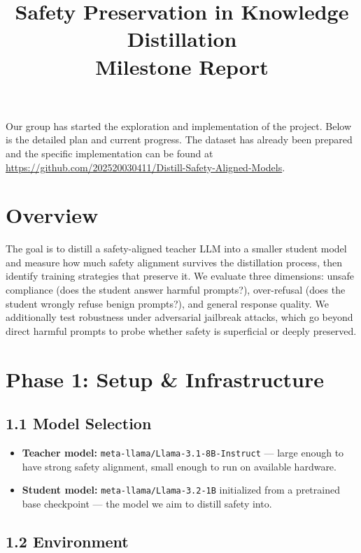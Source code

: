 \documentclass[11pt]{article}
\title{\textbf{Safety Preservation in Knowledge Distillation}\\[0.4em]
\large Milestone Report}
\date{}
\begin{document}
\maketitle

Our group has started the exploration and implementation of the project. Below is the detailed plan and current progress. The dataset has already been prepared and the specific implementation can be found at \href{https://github.com/202520030411/Distill-Safety-Aligned-Models}{https://github.com/202520030411/Distill-Safety-Aligned-Models}.

\section{Overview}

The goal is to distill a safety-aligned teacher LLM into a smaller student model and measure how much safety alignment survives the distillation process, then identify training strategies that preserve it. We evaluate three dimensions: unsafe compliance (does the student answer harmful prompts?), over-refusal (does the student wrongly refuse benign prompts?), and general response quality. We additionally test robustness under adversarial jailbreak attacks, which go beyond direct harmful prompts to probe whether safety is superficial or deeply preserved.

\section{Phase 1: Setup \& Infrastructure}

\subsection{1.1 Model Selection}

\begin{itemize}
    \item \textbf{Teacher model:} \texttt{meta-llama/Llama-3.1-8B-Instruct} --- large enough to have strong safety alignment, small enough to run on available hardware.
    \item \textbf{Student model:} \texttt{meta-llama/Llama-3.2-1B} initialized from a pretrained base checkpoint --- the model we aim to distill safety into.
\end{itemize}

\subsection{1.2 Environment}
\end{document}
